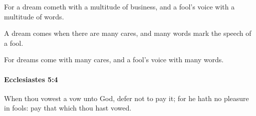 			\begin{versebox}
					\item[BHS] 
					\item[LXX] 
					\item[ASV] For a dream cometh with a multitude of business, and a fool's voice with a multitude of words.
					\item[NIV] A dream comes when there are many cares, and many words mark the speech of a fool.
					\item[NRSV] For dreams come with many cares, and a fool’s voice with many words.
			\end{versebox}

		\paragraph{Ecclesiastes 5:4} %
			\label{ECCLESIASTES-5-4}

			When thou vowest a vow unto God, defer not to pay it; for he hath no pleasure in fools: pay that which thou hast vowed.

